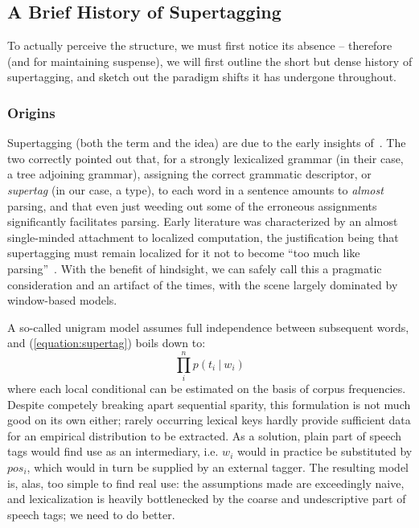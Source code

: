 \subsection{A Brief History of Supertagging}
To actually perceive the structure, we must first notice its absence -- therefore (and for maintaining suspense), we will first outline the short but dense history of supertagging, and sketch out the paradigm shifts it has undergone throughout.

\subsubsection{Origins}
Supertagging (both the term and the idea) are due to the early insights of~\citet{joshi1994disambiguation}.
The two correctly pointed out that, for a strongly lexicalized grammar (in their case, a tree adjoining grammar), assigning the correct grammatic descriptor, or \textit{supertag} (in our case, a type), to each word in a sentence amounts to \textit{almost} parsing, and that even just weeding out some of the erroneous assignments significantly facilitates parsing.
Early literature was characterized by an almost single-minded attachment to localized computation, the justification being that supertagging must remain localized for it not to become ``too much like parsing''~\cite{bangalore1999supertagging}.
With the benefit of hindsight, we can safely call this a pragmatic consideration and an artifact of the times, with the scene largely dominated by window-based models.

A so-called unigram model assumes full independence between subsequent words, and (\ref{equation:supertag}) boils down to:
\begin{equation}
\prod_i^n p(t_i \ | \ w_i)
\end{equation}
where each local conditional can be estimated on the basis of corpus frequencies.
Despite competely breaking apart sequential sparity, this formulation is not much good on its own either; rarely occurring lexical keys hardly provide sufficient data for an empirical distribution to be extracted.
As a solution, plain part of speech tags would find use as an intermediary, i.e. $w_i$ would in practice be substituted by $pos_i$, which would in turn be supplied by an external tagger.
The resulting model is, alas, too simple to find real use: the assumptions made are exceedingly naive, and lexicalization is heavily bottlenecked by the coarse and undescriptive part of speech tags; we need to do better.

